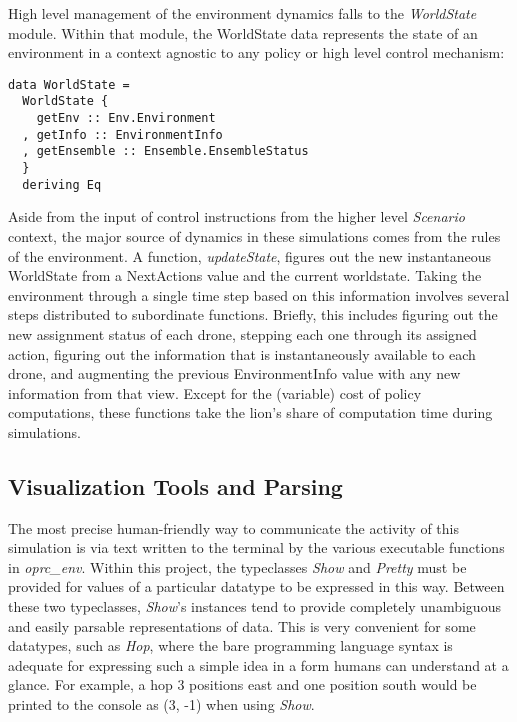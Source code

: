 High level management of the environment dynamics falls to the \textit{WorldState} module. Within that module, the WorldState data represents the state of an environment in a context agnostic to any policy or high level control mechanism:

\begin{verbatim}
data WorldState =
  WorldState {
    getEnv :: Env.Environment
  , getInfo :: EnvironmentInfo
  , getEnsemble :: Ensemble.EnsembleStatus
  }
  deriving Eq
\end{verbatim}

Aside from the input of control instructions from the higher level \textit{Scenario} context, the major source of dynamics in these simulations comes from the rules of the environment. A function, \textit{updateState}, figures out the new instantaneous WorldState from a NextActions value and the current worldstate. Taking the environment through a single time step based on this information involves several steps distributed to subordinate functions. Briefly, this includes figuring out the new assignment status of each drone, stepping each one through its assigned action, figuring out the information that is instantaneously available to each drone, and augmenting the previous EnvironmentInfo value with any new information from that view. Except for the (variable) cost of policy computations, these functions take the lion's share of computation time during simulations.

\subsection{Visualization Tools and Parsing}

The most precise human-friendly way to communicate the activity of this simulation is via text written to the terminal by the various executable functions in \textit{oprc\_env}. Within this project, the typeclasses \textit{Show} and \textit{Pretty} must be provided for values of a particular datatype to be expressed in this way. Between these two typeclasses, \textit{Show}'s instances tend to provide completely unambiguous and easily parsable representations of data. This is very convenient for some datatypes, such as \textit{Hop}, where the bare programming language syntax is adequate for expressing such a simple idea in a form humans can understand at a glance. For example, a hop 3 positions east and one position south would be printed to the console as (3, -1) when using \textit{Show}.

